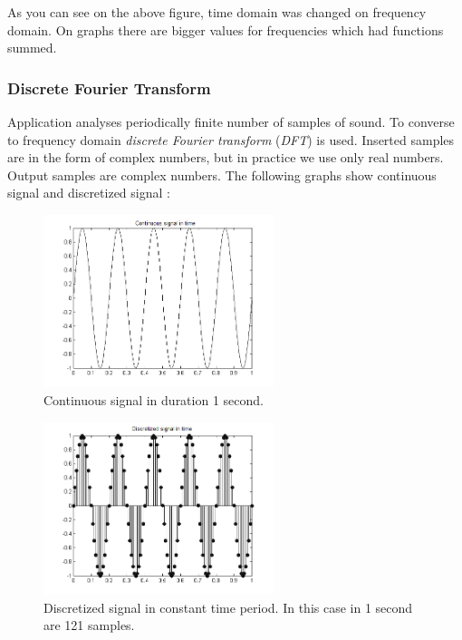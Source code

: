 \documentclass[11pt,titlepage]{article}
\theoremstyle{plain}
\begin{document}
As you can see on the above figure, time domain was changed on frequency domain. On graphs there are bigger values for frequencies which had functions summed.

\subsubsection{Discrete Fourier Transform}
Application analyses periodically finite number of samples of sound. To converse to frequency domain \textit{discrete Fourier transform} (\textit{DFT}) is used. Inserted samples are in the form of complex numbers, but in practice we use only real numbers. Output samples are complex numbers. The following graphs show continuous signal and discretized signal \cite{fourier}:

\begin{figure}[H]
	\centering
	\includegraphics[width=0.6\textwidth]{img/continues}
	\caption{Continuous signal in duration 1 second.}
	\label{fig:F6}
\end{figure}

\begin{figure}[H]
	\centering
	\includegraphics[width=0.6\textwidth]{img/descrete}
	\caption{Discretized signal in constant time period. In this case in 1 second are 121 samples.}
	\label{fig:F7}
\end{figure}
\end{document}
